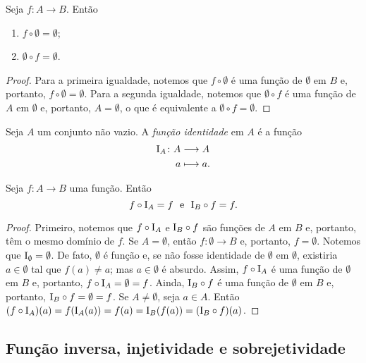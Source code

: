 \begin{proposition}
	Seja $f\colon A \to B$. Então
	\begin{enumerate}
	\item $f \circ \emptyset = \emptyset$;
	\item $\emptyset \circ f = \emptyset$.
	\end{enumerate}
\end{proposition}
\begin{proof}
	Para a primeira igualdade, notemos que $f \circ \emptyset$ é uma função de $\emptyset$ em $B$ e, portanto, $f \circ \emptyset=\emptyset$. Para a segunda igualdade, notemos que $\emptyset \circ f$ é uma função de $A$ em $\emptyset$ e, portanto, $A=\emptyset$, o que é equivalente a $\emptyset \circ f=\emptyset$.
\end{proof}

\begin{definition}
	Seja $A$ um conjunto não vazio. A \emph{função identidade} em $A$ é a função
	\begin{align*}
	{\mathrm{I}_A}\colon {A} &\longrightarrow {A} \\{a} &\longmapsto a.
	\end{align*}
\end{definition}

\begin{proposition}
\label{prop:id.comp.func}
	Seja $f\colon A \to B$ uma função. Então
	\begin{equation*}
	f \circ \mathrm{I}_A = f \text{\ \ e\ \ } \mathrm{I}_B \circ f = f.
	\end{equation*}
\end{proposition}
\begin{proof}
	Primeiro, notemos que $f \circ \mathrm{I}_A$ e $\mathrm{I}_B \circ f$ são funções de $A$ em $B$ e, portanto, têm o mesmo domínio de $f$. Se $A = \emptyset$, então $f: \emptyset \to B$ e, portanto, $f=\emptyset$. Notemos que $\mathrm{I}_\emptyset = \emptyset$. De fato, $\emptyset$ é função e, se não fosse identidade de $\emptyset$ em $\emptyset$, existiria $a \in \emptyset$ tal que $f(a) \neq a$; mas $a \in \emptyset$ é absurdo. Assim, $f \circ \mathrm{I}_A$ é uma função de $\emptyset$ em $B$ e, portanto, $f \circ \mathrm{I}_A = \emptyset = f$. Ainda, $\mathrm{I}_B \circ f$ é uma função de $\emptyset$ em $B$ e, portanto, $\mathrm{I}_B \circ f = \emptyset = f$. Se $A \neq \emptyset$, seja $a \in A$. Então $(f \circ \mathrm{I}_A) (a) = f(\mathrm{I}_A(a)) = f(a) = \mathrm{I}_B(f(a)) = (\mathrm{I}_B \circ f)(a)$.
\end{proof}

\subsection{Função inversa, injetividade e sobrejetividade}

